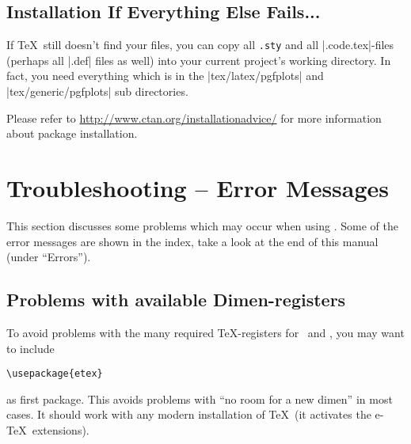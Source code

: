 \subsection{Installation If Everything Else Fails...}
If \TeX\ still doesn't find your files, you can copy all \lstinline!.sty! and all |.code.tex|-files (perhaps all |.def| files as well) into your current project's working directory. In fact, you need everything which is in the |tex/latex/pgfplots| and |tex/generic/pgfplots| sub directories.

Please refer to \url{http://www.ctan.org/installationadvice/} for more information about package installation.



\section{Troubleshooting -- Error Messages}
This section discusses some problems which may occur when using \PGFPlots.
Some of the error messages are shown in the index, take a look at the end of this manual (under ``Errors'').


\subsection{Problems with available Dimen-registers}
To avoid problems with the many required \TeX-registers for \PGF\ and \PGFPlots, you may want to include
\begin{verbatim}
\usepackage{etex}
\end{verbatim}
as first package. This avoids problems with ``no room for a new dimen''
%
in most cases. It should work with any modern installation of \TeX\ (it activates the e-\TeX\ extensions).

